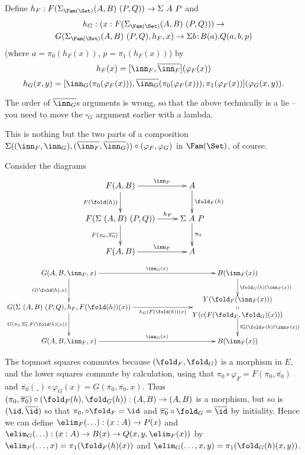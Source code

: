 \documentclass{article}
\begin{document}
Define $h_F : F(\Sigma_{\Fam(\Set)}(A, B)\ (P, Q)) \to \Sigma\ A\ P$ and
\begin{multline*}
h_G : (x :  F(\Sigma_{\Fam(\Set)}(A, B)\ (P, Q))) \to \\ G(\Sigma_{\Fam(\Set)}(A, B)\ (P, Q), h_F, x) \to \Sigma b\!:\!B(a).Q(a, b, p)
\end{multline*}
(where $a = \pi_0(h_F(x))$, $p = \pi_1(h_F(x))$) by
\[
h_F(x) = [\inn_F, \overline{\inn_F}](\varphi_F(x))
\]
\[
h_G(x, y) = [\inn_G(\pi_0(\varphi_F(x))) , \overline{\inn_G}(\pi_0(\varphi_F(x))),\pi_1(\varphi_F(x))  ](\varphi_G(x, y)).
\]

\begin{remark}
  The order of $\overline{\inn_G}$s arguments is wrong, so that the
  above technically is a lie -- you need to move the $\square_G$
  argument earlier with a lambda.
\end{remark}

This is nothing but the two parts of a composition $\Sigma((\inn_F, \inn_G), (\overline{\inn_F}, \overline{\inn_G})) \circ (\varphi_F, \varphi_G)$ in $\Fam(\Set)$, of course.

Consider the diagrams
\[
\xymatrix{
  F(A, B) \ar^-{\inn_F}[r] \ar_-{F(\fold(h))}[d] & A \ar^-{\fold_F(h)}[d] \\
  F(\Sigma\ (A, B)\ (P, Q)) \ar^-{h_F}[r] \ar_-{F(\pi_0, \overline{\pi_0})}[d] & \Sigma\ A\ P \ar^-{\pi_0}[d] \\
    F(A, B) \ar^-{\inn_F}[r] & A }
\]
\[
\xymatrix{
G(A, B, \inn_F, x) \ar^-{\inn_G(x)}[rrr] \ar_-{G(\fold(h), x)}[d]&&& B(\inn_F(x)) \ar^-{\fold_G(h)(\inn_F(x))}[d] \\
G(\Sigma\ (A, B)\ (P, Q), h_F, F(\fold(h))(x)) \ar_-{h_G(F(\fold(h))(x)}[rrr] \ar_-{G(\pi_0, \overline{\pi_0}, F(\fold(h)(x))}[d] &&& *\txt{$Y(\fold_F(\inn_F(x)))$ \\ $\shortparallel$ \\ $Y(c(F(\fold_F, \fold_G)(x)))$} \ar^-{\overline{\pi_0}(\fold_F(h)(\inn_F(x))}[d] \\
G(A, B, \inn_F, x) \ar^-{\inn_G(x)}[rrr] &&& B(\inn_F(x))  \\
}
\]

The topmost squares commutes because $(\fold_F, \fold_G)$ is a
morphism in $E$, and the lower squares commute by calculation, using
that $\pi_0 \circ \varphi_F = F(\pi_0, \overline{\pi_0})$ and
$\overline{\pi_0}(\_) \circ \varphi_G(x) = G(\pi_0, \overline{\pi_0},
x)$.  Thus $(\pi_0, \overline{\pi_0}) \circ (\fold_F(h), \fold_G(h)) :
(A, B) \to (A, B)$ is a morphism, but so is $(\id, \overline{\id})$ so
that $\pi_0, \circ \fold_F = \id$ and $\overline{\pi_0} \circ \fold_G
= \overline{\id}$ by initiality. Hence we can define $\elim_F(\ldots)
: (x : A) \to P(x)$ and $\elim_G(\ldots) : (x : A) \to B(x) \to Q(x,
y, \elim_F(x))$ by $\elim_F(\ldots,x) = \pi_1(\fold_F(h)(x))$ and
$\elim_G(\ldots, x, y) = \pi_1(\fold_G(h)(x, y))$.
\end{document}
